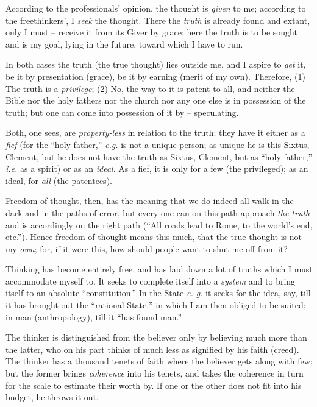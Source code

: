 \documentclass[12pt,a4paper]{book}
\begin{document}
According to the professionals' opinion, the thought is \textit{given} to me; 
according to the freethinkers', I \textit{seek} the thought. There the 
\textit{truth} is already found and extant, only I must -- receive it from its 
Giver by grace; here the truth is to be sought and is my goal, lying in the 
future, toward which I have to run.

In both cases the truth (the true thought) lies outside me, and I aspire to 
\textit{get} it, be it by presentation (grace), be it by earning (merit of my 
own). Therefore, (1) The truth is a \textit{privilege}; (2) No, the way to it 
is patent to all, and neither the Bible nor the holy fathers nor the church 
nor any one else is in possession of the truth; but one can come into 
possession of it by -- speculating.

Both, one sees, are \textit{property-less} in relation to the truth: they have 
it either as a \textit{fief} (for the ``holy father,'' \textit{e.g.} is not 
a unique person; as unique he is this Sixtus, Clement, but he does not have 
the truth as Sixtus, Clement, but as ``holy father,'' \textit{i.e.} as a 
spirit) or as an \textit{ideal}. As a fief, it is only for a few (the 
privileged); as an ideal, for \textit{all} (the patentees).

Freedom of thought, then, has the meaning that we do indeed all walk in the 
dark and in the paths of error, but every one can on this path approach 
\textit{the truth} and is accordingly on the right path (``All roads lead to 
Rome, to the world's end, etc.''). Hence freedom of thought means this much, 
that the true thought is not my \textit{own}; for, if it were this, how should 
people want to shut me off from it?

Thinking has become entirely free, and has laid down a lot of truths which I 
must accommodate myself to. It seeks to complete itself into a \textit{system} 
and to bring itself to an absolute ``constitution.'' In the State \textit{e. 
g.} it seeks for the idea, say, till it has brought out the ``rational 
State,'' in which I am then obliged to be suited; in man (anthropology), till 
it ``has found man.''

The thinker is distinguished from the believer only by believing much more 
than the latter, who on his part thinks of much less as signified by his faith 
(creed). The thinker has a thousand tenets of faith where the believer gets 
along with few; but the former brings \textit{coherence} into his tenets, and 
takes the coherence in turn for the scale to estimate their worth by. If one 
or the other does not fit into his budget, he throws it out.
\end{document}
